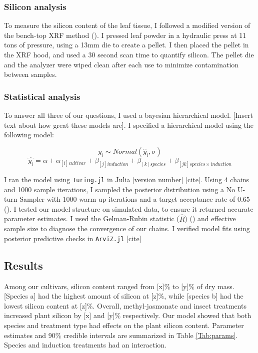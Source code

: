 \documentclass[12pt, letterpaper, ]{article}
\begin{document}
\subsubsection{Silicon analysis}

To measure the silicon content of the leaf tissue, I followed a modified version of the bench-top XRF method (\cite{reidinger_rapid_2012}). I pressed leaf powder in a hydraulic press at 11 tons of pressure, using a 13mm die to create a pellet. I then placed the pellet in the XRF hood, and used a 30 second scan time to quantify silicon. The pellet die and the analyzer were wiped clean after each use to minimize contamination between samples.

\subsubsection{Statistical analysis}

To answer all three of our questions, I used a bayesian hierarchical model. [Insert text about how great these models are]. I specified a hierarchical model using the following model:

\[y_i \sim Normal(\hat{y}_i, \sigma)\]
\[\hat{y_i} = \alpha + \alpha_{[i]cultivar} + \beta_{[j]induction} + \beta_{[k]species} + \beta_{[jk]species \times induction}\]

I ran the model using \verb|Turing.jl| in Julia [version number] [cite]. Using 4 chains and 1000 sample iterations, I sampled the posterior distribution using a No U-turn Sampler with 1000 warm up iterations and a target acceptance rate of 0.65 (\cite{hoffman_no-u-turn_2014}). I tested our model structure on simulated data, to ensure it returned accurate parameter estimates. I used the Gelman-Rubin statistic (\( \hat{R} \)) (\cite{gelman_inference_1992}) and effective sample size to diagnose the convergence of our chains. I verified model fits using posterior predictive checks in \verb|ArviZ.jl| [cite] 

\subsection{Results}

Among our cultivars, silicon content ranged from [x]\% to [y]\% of dry mass. [Species a] had the highest amount of silicon at [z]\%, while [species b] had the lowest silicon content at [z]\%. Overall, methyl-jasmonate and insect treatments increased plant silicon by [x] and [y]\% respectively. Our model showed that both species and treatment type had effects on the plant silicon content. Parameter estimates and 90\% credible intervals are summarized in Table \ref{Tab:params}. Species and induction treatments had an interaction. 
\end{document}
